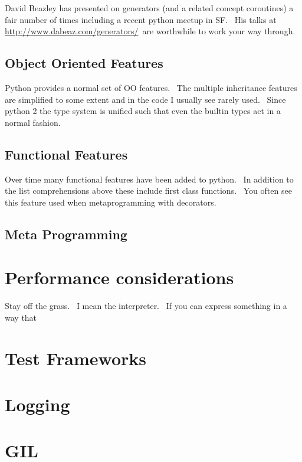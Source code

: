 \documentclass[]{article}
\begin{document}
David Beazley has presented on generators (and a related concept
coroutines) a fair number of times including a recent python meetup in
SF. ~His talks at
\href{http://www.google.com/url?q=http\%3A\%2F\%2Fwww.dabeaz.com\%2Fgenerators\%2F\&sa=D\&sntz=1\&usg=AFQjCNHgQSwBOSX7OQcp3SSqls_7gn5JwQ}{http://www.dabeaz.com/generators/}~are
worthwhile to work your way through.

\subsection{Object Oriented Features}

Python provides a normal set of OO features. ~The multiple inheritance
features are simplified to some extent and in the code I usually see
rarely used. ~Since python 2 the type system is unified such that even
the builtin types act in a normal fashion.

\subsection{Functional Features}

Over time many functional features have been added to python. ~In
addition to the list comprehensions above these include first class
functions. ~You often see this feature used when metaprogramming with
decorators.

\subsection{Meta Programming}

\section{Performance considerations}

Stay off the grass. ~I mean the interpreter. ~If you can express
something in a way that

\section{Test Frameworks}

\section{Logging}

\section{GIL}
\end{document}
